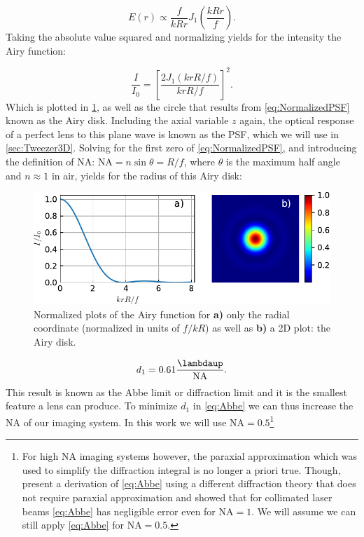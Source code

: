 \begin{equation}\label{eq:AiryField}
    E(r) \propto \frac{f}{kRr} J_1\left(\frac{k R r}{f}\right).
\end{equation}
Taking the absolute value squared and normalizing yields for the intensity the Airy function:

\begin{equation}\label{eq:NormalizedPSF}
    \frac{I}{I_0} = \left[
    \frac{2J_1(k r R/f)}{k r R/f}
    \right]^2.
\end{equation}
Which is plotted in \cref{fig:AiryPlots}, as well as the circle that results from \cref{eq:NormalizedPSF} known as the Airy disk.
Including the axial variable $z$ again, the optical response of a perfect lens to this plane wave is known as the \ac{PSF}, which we will use in \cref{sec:Tweezer3D}.
Solving for the first zero of \cref{eq:NormalizedPSF}, and introducing the definition of \ac{NA}: $\text{NA} = n \sin{\theta} =  R/f$, where $\theta$ is the maximum half angle and $n\approx1$ in air, yields for the radius of this Airy disk:

\begin{figure}
    \centering
    \includegraphics[width = 0.9\linewidth]{figures/AiryDisk.pdf}
    \caption{Normalized plots of the Airy function for \textbf{a)} only the radial coordinate (normalized in units of $f/kR$) as well as \textbf{b)} a 2D plot: the Airy disk.}
    \label{fig:AiryPlots}
\end{figure}

\begin{equation}\label{eq:Abbe}
    d_1 = 0.61 \frac{\lambdaup}{\text{NA}}.
\end{equation}
This result is known as the Abbe limit or diffraction limit \cite{Abbe1882} and it is the smallest feature a lens can produce.
To minimize $d_1$ in \cref{eq:Abbe} we can thus increase the \ac{NA} of our imaging system. 
In this work we will use $\text{NA} = 0.5$\footnote{For high NA imaging systems however, the paraxial approximation which was used to simplify the diffraction integral is no longer a priori true. 
Though, \cite{Chon2007} present a derivation of \cref{eq:Abbe} using a different diffraction theory that does not require paraxial approximation and showed that for collimated laser beams \cref{eq:Abbe} has negligible error even for $\text{NA} = 1$. 
We will assume we can still apply \cref{eq:Abbe} for $\text{NA} = 0.5$.}

